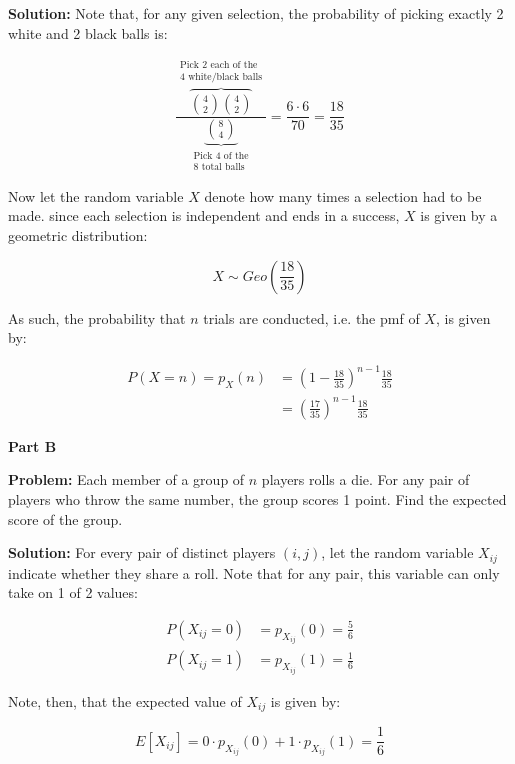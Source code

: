 \documentclass{article}
\begin{document}
\noindent\textbf{Solution:} Note that, for any given selection, the probability of picking exactly 2 white and 2 black balls is:

\begin{equation*}
    \frac{\overbrace{\binom{4}{2}\binom{4}{2}}^{\substack{\text{Pick 2 each of the}\\\text{4 white/black balls}}}}{\underbrace{\binom{8}{4}}_{\substack{\text{Pick 4 of the}\\\text{8 total balls}}}}=\frac{6\cdot6}{70}=\frac{18}{35}
\end{equation*}

Now let the random variable $X$ denote how many times a selection had to be made. since each selection is independent and ends in a success, $X$ is given by a geometric distribution:

\begin{equation*}
    X\sim Geo\left(\frac{18}{35}\right)
\end{equation*}

As such, the probability that $n$ trials are conducted, i.e. the pmf of $X$, is given by:

\begin{align*}
    P(X=n)=p_X(n)&=\left(1-\frac{18}{35}\right)^{n-1}\frac{18}{35}\\
    &=\left(\frac{17}{35}\right)^{n-1}\frac{18}{35}
\end{align*}
\pagebreak

\begin{center}
    \Large{\textbf{Part B}}
\end{center}
\noindent\textbf{Problem:} Each member of a group of $n$ players rolls a die. For any pair of players who throw the same number, the group scores 1 point. Find the expected score of the group.
\bigskip

\noindent\textbf{Solution:} For every pair of distinct players $(i,j)$, let the random variable $X_{ij}$ indicate whether they share a roll. Note that for any pair, this variable can only take on 1 of 2 values:

\begin{align*}
    P(X_{ij}=0)&=p_{X_{ij}}(0)=\frac{5}{6}\\
    P(X_{ij}=1)&=p_{X_{ij}}(1)=\frac{1}{6}
\end{align*}

Note, then, that the expected value of $X_{ij}$ is given by:

\begin{equation*}
    E[X_{ij}]=0\cdot p_{X_{ij}}(0)+1\cdot p_{X_{ij}}(1)=\frac{1}{6}
\end{equation*}
\end{document}
